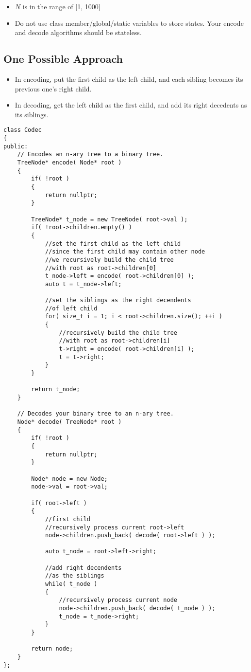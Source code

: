 \begin{itemize}
\item $ N $ is in the range of [1, 1000]
\item Do not use class member/global/static variables to store states. Your encode and decode algorithms should be stateless.
\end{itemize}

\subsection{One Possible Approach}
\begin{itemize}
\item In encoding, put the first child as the left child, and each sibling becomes its previous one's right child.
\item In decoding, get the left child as the first child, and add its right decedents as its siblings. 
\end{itemize}

\setcounter{lstlisting}{0}
\begin{lstlisting}[style=customc, caption={Left Child And Right Decendents}]
class Codec
{
public:
    // Encodes an n-ary tree to a binary tree.
    TreeNode* encode( Node* root )
    {
        if( !root )
        {
            return nullptr;
        }

        TreeNode* t_node = new TreeNode( root->val );
        if( !root->children.empty() )
        {
            //set the first child as the left child
            //since the first child may contain other node
            //we recursively build the child tree
            //with root as root->children[0]
            t_node->left = encode( root->children[0] );
            auto t = t_node->left;

            //set the siblings as the right decendents
            //of left child
            for( size_t i = 1; i < root->children.size(); ++i )
            {
                //recursively build the child tree
                //with root as root->children[i]
                t->right = encode( root->children[i] );
                t = t->right;
            }
        }

        return t_node;
    }

    // Decodes your binary tree to an n-ary tree.
    Node* decode( TreeNode* root )
    {
        if( !root )
        {
            return nullptr;
        }

        Node* node = new Node;
        node->val = root->val;

        if( root->left )
        {
            //first child
            //recursively process current root->left
            node->children.push_back( decode( root->left ) );

            auto t_node = root->left->right;

            //add right decendents
            //as the siblings
            while( t_node )
            {
                //recursively process current node
                node->children.push_back( decode( t_node ) );
                t_node = t_node->right;
            }
        }

        return node;
    }
};
 \end{lstlisting}